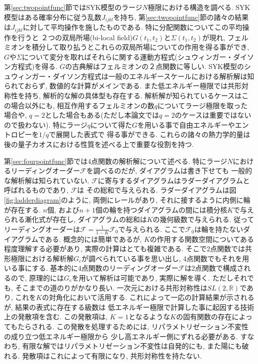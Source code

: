 第\ref{sec:twopointfunc}節ではSYK模型のラージ$N$極限における構造を調べる. 
SYK模型はある確率分布に従う乱数$J_{ijkl}$を持ち, 
第\ref{sec:twopointfunc}節の諸々の結果は$J_{ijkl}$に対して平均操作を施したものである. 
特に分配関数についてこの平均操作を行うと
２つの双局所場(bi-local field)$G(t_1, t_2)$と$\Sigma(t_1, t_2)$が現れ, 
フェルミオンを積分して取り払うとこれらの双局所場についての作用を得る事ができ, 
$G$や$\Sigma$について変分を取ればそれらに関する運動方程式(シュウィンガー・ダイソン方程式)を得る. 
$G$の古典解はフェルミオンの２点関数に等しい. 
SYK模型のシュウィンガー・ダイソン方程式は一般のエネルギースケールにおける解析解は知られておらず, 
数値的な計算がメインである. 
また低エネルギー極限では共形対称性を持ち, 解析的な解の具体型も存在する. 
解析解が知られているケースはこの場合以外にも, 
相互作用するフェルミオンの数$q$についてラージ極限を取った場合や, 
$q=2$とした場合もある(ただし本論文では$q=2$のケースは重要ではないので扱わない). 
特にラージ$q$について得た$G$を用いる事で自由エネルギーやエントロピーを$1/q$で展開した表式で
得る事ができる. 
これらの諸々の熱力学的量は後の量子カオスにおける性質を述べる上で重要な役割を持つ. 

第\ref{sec:fourpointfunc}節では4点関数の解析解について述べる. 
特にラージ$N$におけるリーディングオーダー$\mathcal{F}$を調べるのだが, ダイアグラムは書き下せても
一般的な解析解は知られていない. 
$\mathcal{F}$に寄与するダイアグラムはラダーダイアグラムと呼ばれるものであり, $\mathcal{F}$は
その総和で与えられる. 
ラダーダイアグラムは図\ref{fig:ladderdiagram}のように, 両側にレールがあり, 
それに接するように内側に輪が存在する. 
$n$個, および$n+1$個の輪を持つダイアグラムの間には積分核$K$で与えられる漸化式が存在し, 
ダイアグラムの総和は$K$の幾何級数で与えられる. 
従ってリーディングオーダーは$\mathcal{F} = \frac{1}{1-K}\mathcal{F}_0$で与えられる. 
ここで$\mathcal{F}_0$は輪を持たないダイアグラムである. 
概念的には簡単であるが, $K$の作用する関数空間についてある程度理解する必要があり, 
実際の計算はとても複雑である. 
そこで2点関数では共形極限における解析解$G_c$が調べられている事を思い出し, 
4点関数でもそれを用いる事にする. 
基本的に4点関数のリーディングオーダー$\mathcal{F}$は2点関数で構成されるので, 
原理的には$G_c$を用いて解析は可能であり, 実際に解を導く. 
ただしそれでも, そこまでの道のりがかなり長い. 
一次元における共形対称性は$SL(2, \mathbb{R})$であり, これを$K$の対角化において活用する. 
これによって一応の計算結果が示されるが, 結果の表式に存在する級数は
低エネルギー極限で計算した事に起因する技術上の発散項を含む. 
この発散項は, $K = 1$となるような$K$の固有関数の存在によってもたらされる. 
この発散を処理するためには, リパラメトリゼーション不変性の成り立つ低エネルギー極限から
少し高エネルギー側にずれる必要がある. 
すなわち, 有限な解ではリパラメトリゼーション不変性は自発的にも, また陽にも破れる. 
発散項はこれによって有限になり, 共形対称性を持たない. 

